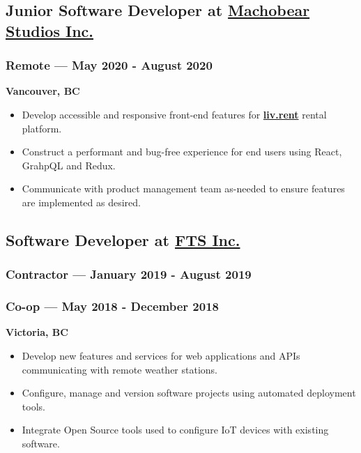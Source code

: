 \documentclass[letterpaper]{article}
\begin{document}
\subsection{Junior Software Developer at \href{https://machobear.ca}{Machobear Studios Inc.}}
\label{sec:orgc3a3a99}
\vspace{-1.2ex}
\subsubsection{Remote --- May 2020 - August 2020}
\label{sec:org257e16c}
\vspace{1.2ex}
\textbf{Vancouver, BC}
\begin{itemize}
\item Develop accessible and responsive front-end features for \textbf{\href{https://liv.rent}{liv.rent}} rental platform.
\item Construct a performant and bug-free experience for end users using React, GrahpQL and Redux.
\item Communicate with product management team as-needed to ensure features are implemented as desired.
\end{itemize}
\vspace{0.5ex}
\subsection{Software Developer at \href{https://ftsinc.com}{FTS Inc.}}
\label{sec:orgf6ae06e}
\vspace{-1.6ex}
\subsubsection{Contractor --- January 2019 - August 2019}
\label{sec:org675796f}
\vspace{2.4ex}
\subsubsection{Co-op --- May 2018 - December 2018}
\label{sec:orgef9c645}
\vspace{-1.9ex}
\textbf{Victoria, BC}
\begin{itemize}
\item Develop new features and services for web applications and APIs communicating with remote weather stations.
\item Configure, manage and version software projects using automated deployment tools.
\item Integrate Open Source tools used to configure IoT devices with existing software.
\end{itemize}
\vspace{0.6ex}
\end{document}
